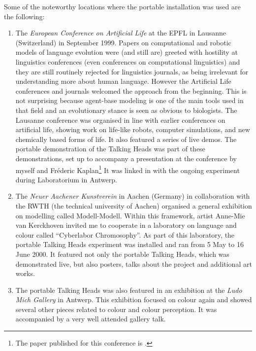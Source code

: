 Some of the noteworthy locations where the portable installation was used are the following: 

\begin{enumerate}
\item The {\itshape European Conference on Artificial Life} at the EPFL in Lausanne (Switzerland) in September 1999. 
Papers on computational and robotic 
models of language evolution were (and still are) greeted with hostility at linguistics conferences (even 
conferences on computational linguistics) and they are still routinely rejected for linguistics journals, as 
being irrelevant for understanding more about human language. 
However the Artificial Life conferences and journals welcomed the approach from the beginning. This is 
not surprising because agent-base modeling is one of the main tools used in that field and an evolutionary 
stance is seen as obvious to biologists. The Lausanne conference was organised in line with earlier 
conferences on artificial life, showing work on life-like robots, computer simulations, and new chemically based 
forms of life. It also featured a series of live demos. The portable demonstration of the Talking Heads was part 
of these demonstrations, set up to accompany a presentation at 
the conference by myself and Fr\'{e}deric Kaplan\footnote{
The paper published for this conference is \cite{Steels:1999}.}
It was linked in with the ongoing experiment during Laboratorium in Antwerp. 
\item The {\itshape Neuer Aachener Kunstverein} in Aachen (Germany) in collaboration with the 
RWTH (the technical university of Aachen) organised a general exhibition on modelling called 
Modell-Modell. Within this framework, artist Anne-Mie van Kerckhoven invited me to cooperate in a laboratory on 
language and colour called ``Cyberlabor Chromosophy''. As part of this laboratory, the portable Talking Heads 
experiment was installed and ran from 5 May to 16 June 2000. It featured not only the portable Talking Heads, 
which was demonstrated live, but also posters, talks about the project and additional art works. 
\item The portable Talking Heads was also featured in an exhibition at the {\itshape Ludo Mich Gallery} in Antwerp. This 
exhibition focused on colour again and showed several other pieces related to colour and colour perception. 
It was accompanied by a very well attended gallery talk. 
\end{enumerate}

